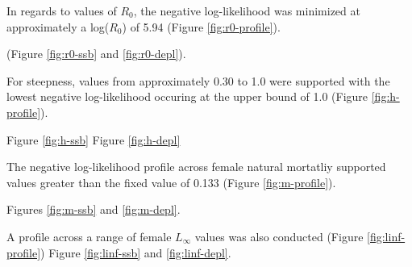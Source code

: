 \documentclass[11pt,
  english,
  a4paper,
]{article}
\begin{document}
\leavevmode\tagmcend\tagstructend\par


In regards to values of {\(R_0\)\leavevmode\tagmcend\tagstructend}, the negative log-likelihood was minimized at approximately a log({\(R_0\)\leavevmode\tagmcend\tagstructend}) of 5.94 (Figure \ref{fig:r0-profile}).

\leavevmode\tagmcend\tagstructend\par


(Figure \ref{fig:r0-ssb} and \ref{fig:r0-depl}).

\leavevmode\tagmcend\tagstructend\par


For steepness, values from approximately 0.30 to 1.0 were supported with the lowest negative log-likelihood occuring at the upper bound of 1.0 (Figure \ref{fig:h-profile}).

\leavevmode\tagmcend\tagstructend\par


Figure \ref{fig:h-ssb} Figure \ref{fig:h-depl}

\leavevmode\tagmcend\tagstructend\par


The negative log-likelihood profile across female natural mortatliy supported values greater than the fixed value of 0.133 (Figure \ref{fig:m-profile}).

\leavevmode\tagmcend\tagstructend\par


Figures \ref{fig:m-ssb} and \ref{fig:m-depl}.

\leavevmode\tagmcend\tagstructend\par


A profile across a range of female {\(L_{\infty}\)\leavevmode\tagmcend\tagstructend} values was also conducted (Figure \ref{fig:linf-profile}) Figure \ref{fig:linf-ssb} and \ref{fig:linf-depl}.
\end{document}
